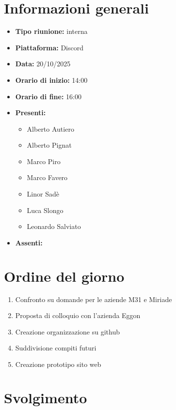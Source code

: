 \documentclass[a4paper,12pt]{article}
\begin{document}
\newpage

\tableofcontents
\newpage


\section{Informazioni generali}

\begin{itemize}
    \item \textbf{Tipo riunione:} interna
    \item \textbf{Piattaforma:} Discord
    \item \textbf{Data:} 20/10/2025
    \item \textbf{Orario di inizio:} 14:00
    \item \textbf{Orario di fine:} 16:00
    \item \textbf{Presenti:}
    \begin{itemize}[leftmargin=1.5em, itemsep=3pt, label={\rule[0.5ex]{0.4em}{0.4em}}]
        \item Alberto Autiero
        \item Alberto Pignat
        \item Marco Piro
        \item Marco Favero
        \item Linor Sadè
        \item Luca Slongo
        \item Leonardo Salviato
    \end{itemize}
    \item \textbf{Assenti:}

\end{itemize}

\section{Ordine del giorno}

\begin{enumerate}
    \item Confronto su domande per le aziende M31 e Miriade
    \item Proposta di colloquio con l'azienda Eggon
    \item Creazione organizzazione su github
    \item Suddivisione compiti futuri
    \item Creazione prototipo sito web
\end{enumerate}

\section{Svolgimento}
\end{document}
